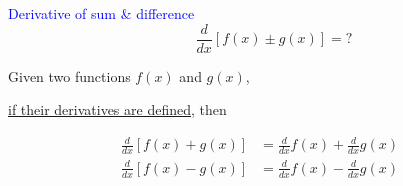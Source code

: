 \documentclass[14pt,fleqn]{extarticle}
\begin{document}
 

\begin{skill}
\begin{narrow}
\textcolor{blue}{Derivative of sum \& difference}
\[ \qquad \dfrac{d}{dx} \left[f(x) \pm g(x) \right] = ? \]
\end{narrow}

\reason 

Given two functions $f(x)$ and $g(x)$, 

\underline{if their derivatives are defined}, then

%
\begin{align}
\frac{d}{dx}\left[ f(x) + g(x)\right] &= \frac{d}{dx}f(x) + \frac{d}{dx}g(x) \\
\frac{d}{dx}\left[ f(x) - g(x)\right] &= \frac{d}{dx}f(x) - \frac{d}{dx}g(x)
\end{align}
\end{skill} 
\end{document}

